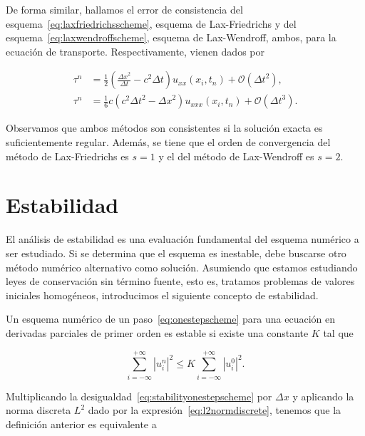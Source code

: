 De forma similar, hallamos el error de consistencia del
esquema~\eqref{eq:laxfriedrichsscheme}, esquema de Lax-Friedrichs y
del esquema~\eqref{eq:laxwendroffscheme}, esquema de Lax-Wendroff,
ambos, para la ecuación de transporte.
Respectivamente, vienen dados por

\begin{align*}
  \tau^{n} & =
  \frac{1}{2}
  \left(
  \frac{{\Delta x}^{2}}{\Delta t}-
  c^{2}\Delta t
  \right)
  u_{xx}
  \left(x_{i},t_{n}\right)+
  \mathcal{O}
  \left({\Delta t}^{2}\right), \\
  \tau^{n} & =
  \frac{1}{6}
  c
  \left(
  c^{2}{\Delta t}^{2}-
  {\Delta x}^{2}
  \right)
  u_{xxx}\left(x_{i},t_{n}\right)+
  \mathcal{O}\left({\Delta t}^{3}\right).
\end{align*}

Observamos que ambos métodos son consistentes si la solución exacta
es suficientemente regular.
Además, se tiene que el orden de convergencia del método de
Lax-Friedrichs es $s=1$ y el del método de Lax-Wendroff es $s=2$.

\section{Estabilidad}

El análisis de estabilidad es una evaluación fundamental del esquema
numérico a ser estudiado.
Si se determina que el esquema es inestable, debe buscarse otro
método numérico alternativo como solución.
Asumiendo que estamos estudiando leyes de conservación sin
término fuente, esto es, tratamos problemas de valores iniciales
homogéneos, introducimos el siguiente concepto de estabilidad.

\begin{definition}
  Un esquema numérico de un paso~\eqref{eq:onestepscheme} para una
  ecuación en derivadas parciales de primer orden es estable si
  existe una constante $K$ tal que

  \begin{equation}\label{eq:stabilityonestepscheme}
    \sum_{i=-\infty}^{+\infty}
    {\left|u^{n}_{i}\right|}^{2}\leq
    K
    \sum_{i=-\infty}^{+\infty}
    {\left|u^{0}_{i}\right|}^{2}.
  \end{equation}
\end{definition}

Multiplicando la desigualdad~\eqref{eq:stabilityonestepscheme} por
$\Delta x$ y aplicando la norma discreta $L^{2}$ dado por la
expresión~\eqref{eq:l2normdiscrete}, tenemos que la definición
anterior es equivalente a

